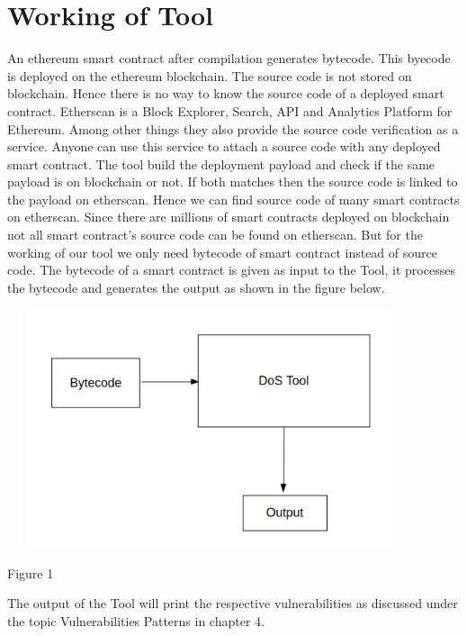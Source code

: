 \chapter{Working of Tool}
\label{ch:work}
An ethereum smart contract after compilation generates bytecode. This byecode is deployed on the ethereum blockchain. The source code is not stored on blockchain. Hence there is no way to know the source code of a deployed smart contract. Etherscan\cite{etherscan} is a Block Explorer, Search, API and Analytics Platform for Ethereum. Among other things they also provide the source code verification as a service. Anyone can use this service to attach a source code with any deployed smart contract. The tool build the deployment payload and check if the same payload is on blockchain or not. If both matches then the source code is linked to the payload on etherscan\cite{ptb}. Hence we can find source code of many smart contracts on etherscan. Since there are millions of smart contracts deployed on blockchain not all smart contract's source code can be found on etherscan. But for the working of our tool we only need bytecode of smart contract instead of source code. The bytecode of a smart contract is given as input to the Tool, it processes the bytecode and generates the output as shown in the figure below.\\
\begin{center}
\includegraphics[width = 12cm, height = 7cm]{images/1.png}

    Figure 1
\end{center}
The output of the Tool will print the respective vulnerabilities as discussed under the topic Vulnerabilities Patterns in chapter 4.
